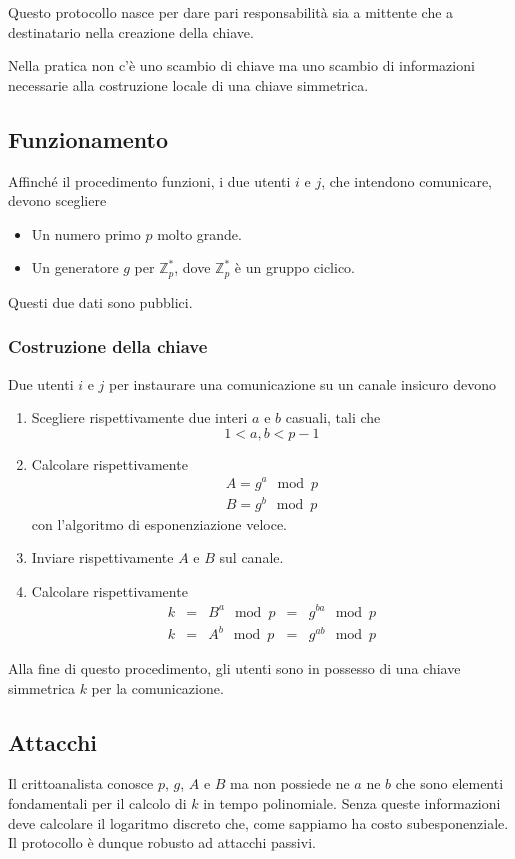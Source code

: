 Questo protocollo nasce per dare pari responsabilit\`a sia a mittente che a destinatario nella creazione della
chiave.

Nella pratica non c'\`e uno scambio di chiave ma uno scambio di informazioni necessarie alla costruzione locale
di una chiave simmetrica.

\subsection{Funzionamento}
Affinch\'e il procedimento funzioni, i due utenti $i$ e $j$, che intendono comunicare, devono scegliere
\begin{itemize}
	\item Un numero primo $p$ molto grande.
	\item Un generatore $g$ per $\mathbb{Z}_p^*$, dove $\mathbb{Z}_p^*$ \`e un gruppo ciclico.
\end{itemize}
Questi due dati sono pubblici.

\subsubsection{Costruzione della chiave}
Due utenti $i$ e $j$ per instaurare una comunicazione su un canale insicuro devono
\begin{enumerate}
	\item Scegliere rispettivamente due interi $a$ e $b$ casuali, tali che
	      \[ 1 < a, b < p-1 \]
	\item Calcolare rispettivamente
	      \[
		      \begin{matrix}
			      A = g^a \mod{p} \\
			      B = g^b \mod{p}
		      \end{matrix}
	      \]
	      con l'algoritmo di esponenziazione veloce.
	\item Inviare rispettivamente $A$ e $B$ sul canale.
	\item Calcolare rispettivamente
	      \[
		      \begin{matrix}
			      k & = & B^a \mod{p} & = & g^{ba} \mod{p} \\
			      k & = & A^b \mod{p} & = & g^{ab} \mod{p}
		      \end{matrix}
	      \]
\end{enumerate}
Alla fine di questo procedimento, gli utenti sono in possesso di una chiave simmetrica $k$ per la comunicazione.

\subsection{Attacchi}
Il crittoanalista conosce $p$, $g$, $A$ e $B$ ma non possiede ne $a$ ne $b$ che sono elementi fondamentali per il
calcolo di $k$ in tempo polinomiale. Senza queste informazioni deve calcolare il logaritmo discreto che, come sappiamo
ha costo subesponenziale. Il protocollo \`e dunque robusto ad attacchi passivi.


